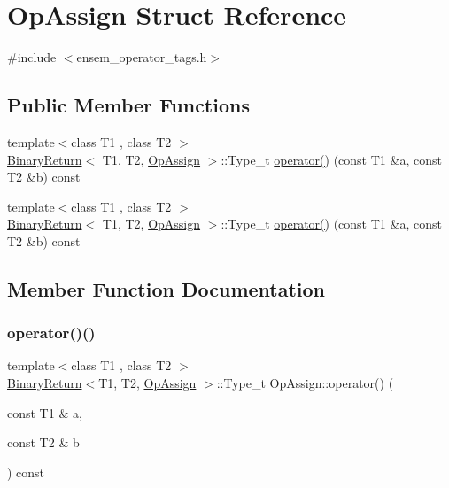 \hypertarget{structOpAssign}{}\section{Op\+Assign Struct Reference}
\label{structOpAssign}


{\ttfamily \#include $<$ensem\+\_\+operator\+\_\+tags.\+h$>$}

\subsection*{Public Member Functions}
\begin{DoxyCompactItemize}
\item 
{\footnotesize template$<$class T1 , class T2 $>$ }\\\mbox{\hyperlink{structBinaryReturn}{Binary\+Return}}$<$ T1, T2, \mbox{\hyperlink{structOpAssign}{Op\+Assign}} $>$\+::Type\+\_\+t \mbox{\hyperlink{structOpAssign_a1fec7678b3c8924f7bac6a4feb4eb3d0}{operator()}} (const T1 \&a, const T2 \&b) const
\item 
{\footnotesize template$<$class T1 , class T2 $>$ }\\\mbox{\hyperlink{structBinaryReturn}{Binary\+Return}}$<$ T1, T2, \mbox{\hyperlink{structOpAssign}{Op\+Assign}} $>$\+::Type\+\_\+t \mbox{\hyperlink{structOpAssign_a1fec7678b3c8924f7bac6a4feb4eb3d0}{operator()}} (const T1 \&a, const T2 \&b) const
\end{DoxyCompactItemize}


\subsection{Member Function Documentation}
\mbox{\label{structOpAssign_a1fec7678b3c8924f7bac6a4feb4eb3d0}} 
\subsubsection{\texorpdfstring{operator()()}{operator()()}\hspace{0.1cm}{\footnotesize\ttfamily [1/2]}}
{\footnotesize\ttfamily template$<$class T1 , class T2 $>$ \\
\mbox{\hyperlink{structBinaryReturn}{Binary\+Return}}$<$T1, T2, \mbox{\hyperlink{structOpAssign}{Op\+Assign}} $>$\+::Type\+\_\+t Op\+Assign\+::operator() (\begin{DoxyParamCaption}\item[{const T1 \&}]{a,  }\item[{const T2 \&}]{b }\end{DoxyParamCaption}) const\hspace{0.3cm}{\ttfamily [inline]}}

